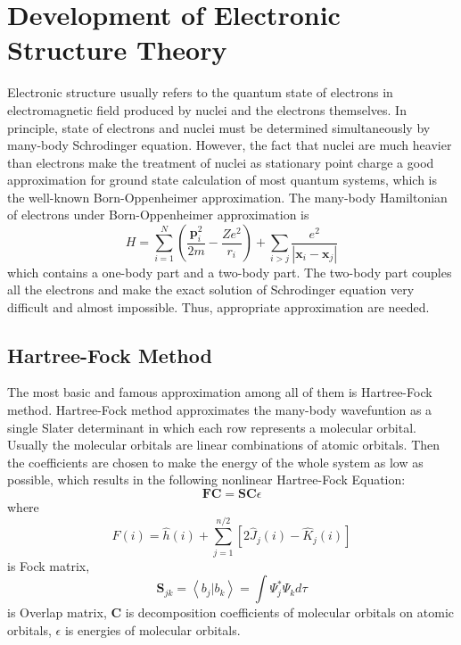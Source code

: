 \chapter{Development of Electronic Structure Theory}
Electronic structure usually refers to the quantum state of electrons in electromagnetic field produced by nuclei and the electrons themselves.\cite{elecstruc}
In principle, state of electrons and nuclei must be determined simultaneously by many-body Schrodinger equation.
However, the fact that nuclei are much heavier than electrons make the treatment of nuclei as stationary point charge a good approximation for ground state calculation of most quantum systems, which is the well-known Born-Oppenheimer approximation.\cite{sakurai}
The many-body Hamiltonian of electrons under Born-Oppenheimer approximation is
\begin{equation}
H=\sum_{i=1}^{N}\left(\frac{\boldsymbol{p}_{i}^{2}}{2 m}-\frac{Z e^{2}}{r_{i}}\right)+\sum_{i>j} \frac{e^{2}}{\left|\boldsymbol{x}_{i}-\boldsymbol{x}_{j}\right|}
\end{equation}
which contains a one-body part and a two-body part.
The two-body part couples all the electrons and make the exact solution of Schrodinger equation very difficult and almost impossible.
Thus, appropriate approximation are needed.


\section{Hartree-Fock Method}
The most basic and famous approximation among all of them is Hartree-Fock method.\cite{hartree}
Hartree-Fock method approximates the many-body wavefuntion as a single Slater determinant in which each row represents a molecular orbital. 
Usually the molecular orbitals are linear combinations of atomic orbitals. 
Then the coefficients are chosen to make the energy of the whole system as low as possible, which results in the following nonlinear Hartree-Fock Equation:
\begin{equation}
\mathbf{F} \mathbf{C}=\mathbf{S} \mathbf{C} \epsilon
\end{equation}
where
\begin{equation}
\hat{F}(i)=\hat{h}(i)+\sum_{j=1}^{n / 2}\left[2 \hat{J}_{j}(i)-\hat{K}_{j}(i)\right]
\end{equation}
is Fock matrix, 
\begin{equation}
\mathbf{S}_{j k}=\left\langle b_{j} | b_{k}\right\rangle=\int \Psi_{j}^{*} \Psi_{k} d \tau
\end{equation}
is Overlap matrix,
$\mathbf{C}$ is decomposition coefficients of molecular orbitals on atomic orbitals,
$\epsilon$ is energies of molecular orbitals.

